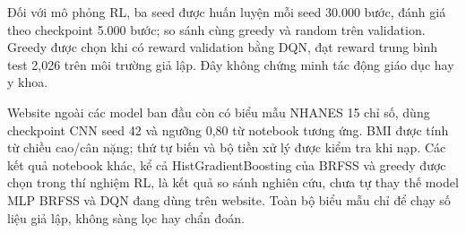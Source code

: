 Đối với mô phỏng RL, ba seed được huấn luyện mỗi seed 30.000 bước, đánh giá theo checkpoint 5.000 bước; so sánh cùng greedy và random trên validation. Greedy được chọn khi có reward validation bằng DQN, đạt reward trung bình test 2,026 trên môi trường giả lập. Đây không chứng minh tác động giáo dục hay y khoa.

Website ngoài các model ban đầu còn có biểu mẫu NHANES 15 chỉ số, dùng checkpoint CNN seed 42 và ngưỡng 0,80 từ notebook tương ứng. BMI được tính từ chiều cao/cân nặng; thứ tự biến và bộ tiền xử lý được kiểm tra khi nạp. Các kết quả notebook khác, kể cả HistGradientBoosting của BRFSS và greedy được chọn trong thí nghiệm RL, là kết quả so sánh nghiên cứu, chưa tự thay thế model MLP BRFSS và DQN đang dùng trên website. Toàn bộ biểu mẫu chỉ để chạy số liệu giả lập, không sàng lọc hay chẩn đoán.
